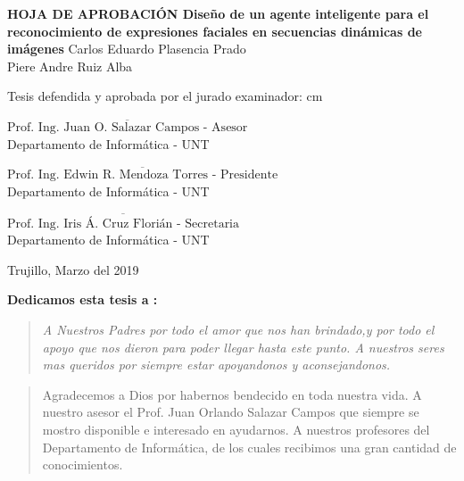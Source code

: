 \begin{center}
 {\bf {\Large HOJA DE APROBACIÓN }     
 \vskip 1.5cm
  {\Large Diseño de un agente inteligente para el reconocimiento de expresiones faciales en secuencias dinámicas de imágenes}}
 \vskip 1cm 
  {\large{Carlos Eduardo Plasencia Prado}}\\
    {\large{Piere Andre Ruiz Alba}}

 \vskip 1cm
\end{center} 
Tesis defendida y aprobada por el jurado examinador:
 cm
\begin{flushleft} 
$\overline{\mbox{Prof. Ing. Juan O. Salazar Campos - Asesor}}$\\
\vskip -0.5cm
Departamento de Informática - UNT
\end{flushleft} 
\vskip 0.8cm
\begin{flushleft} 
$\overline{\mbox{Prof. Ing. Edwin R. Mendoza Torres - Presidente}}$\\
\vskip -0.5cm
Departamento de Informática - UNT
\end{flushleft} 
\vskip 0.8cm
\begin{flushleft} 
$\overline{\mbox{Prof. Ing. Iris Á. Cruz Florián - Secretaria}}$\\
\vskip -0.5cm
Departamento de Informática - UNT
\end{flushleft}
\vskip 0.5cm 
\begin{center}    
Trujillo, Marzo del 2019
\end{center} 
\newpage


 
 {\bf\Large {Dedicamos esta tesis a :}}
 \vskip 1cm
\begin{quotation}
{\it A Nuestros Padres por todo el amor que nos han brindado,y por todo el apoyo que nos dieron para poder llegar hasta este punto.
\vskip 1cm
A nuestros seres mas queridos por siempre estar apoyandonos y aconsejandonos.
}
\end{quotation}


\newpage

 {\bf\Large {}}
 \vskip 1.5cm
\begin{quotation}
Agradecemos a Dios por habernos bendecido en toda nuestra vida.
{\vskip 1cm}
A nuestro asesor el Prof. Juan Orlando Salazar Campos que siempre se mostro disponible e interesado en ayudarnos.
\vskip 1cm
A nuestros profesores del Departamento de Informática, de los cuales recibimos una gran cantidad de conocimientos.
\vskip 1cm
 \end{quotation}


